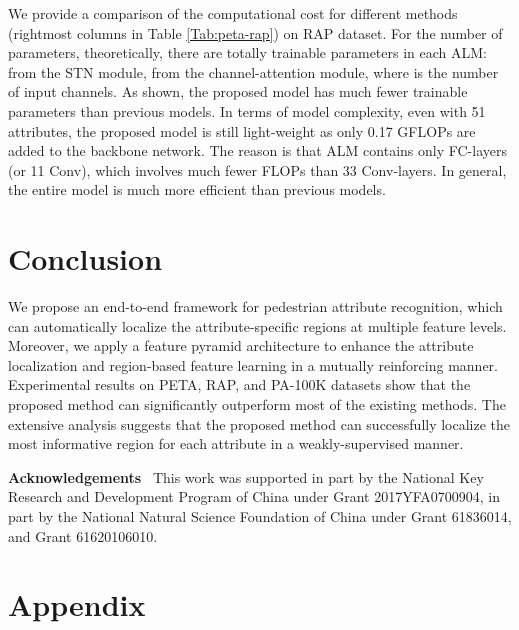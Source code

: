 \documentclass[10pt,twocolumn,letterpaper]{article}
\begin{document}
We provide a comparison of the computational cost for different methods (rightmost columns in Table \ref{Tab:peta-rap}) on RAP dataset.
For the number of parameters, theoretically, there are totally  trainable parameters in each ALM:
 from the STN module,  from the channel-attention module, where  is the number of input channels.
As shown, the proposed model has much fewer trainable parameters than previous models.
In terms of model complexity, even with 51 attributes, the proposed model is still light-weight as only 0.17 GFLOPs are added to the backbone network.
The reason is that ALM contains only FC-layers (or 11 Conv), which involves much fewer FLOPs than 33 Conv-layers.
In general, the entire model is much more efficient than previous models.


\section{Conclusion}
We propose an end-to-end framework for pedestrian attribute recognition, which can automatically localize the attribute-specific regions at multiple feature levels.
Moreover, we apply a feature pyramid architecture to enhance the attribute localization and region-based feature learning in a mutually reinforcing manner.
Experimental results on PETA, RAP, and PA-100K datasets show that the proposed method can significantly outperform most of the existing methods.
The extensive analysis suggests that the proposed method can successfully localize the most informative region for each attribute in a weakly-supervised manner.

\noindent\textbf{Acknowledgements} \
This work was supported in part by the National Key Research and Development Program of China under Grant 2017YFA0700904, in part by the National Natural Science Foundation of China under Grant 61836014, and Grant 61620106010.

{\small


}




\appendix

\section*{Appendix}

\setcounter{table}{0}
\setcounter{figure}{0}
\setcounter{equation}{0}
\renewcommand{\theequation}{S\arabic{equation}}
\renewcommand{\thefigure}{S\arabic{figure}}
\renewcommand{\thetable}{S\arabic{table}}
\renewcommand{\theHfigure}{S\arabic{figure}}
\renewcommand{\theHtable}{S\arabic{table}}
\end{document}
